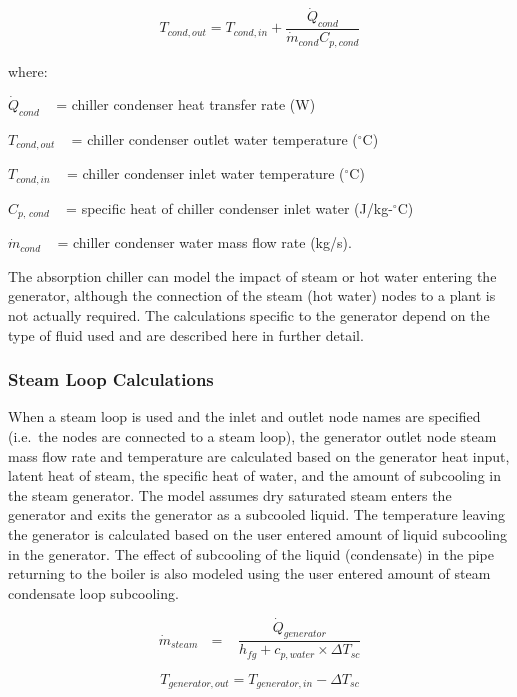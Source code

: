 \begin{equation}
  T_{cond,out} = T_{cond,in} + \frac{\dot{Q}_{cond}}{\dot{m}_{cond}C_{p,cond}}
\end{equation}

where:

\({\dot Q_{cond}}\) ~ = chiller condenser heat transfer rate (W)

\({T_{cond,out}}\) ~ = chiller condenser outlet water temperature (\(^{\circ}\)C)

\({T_{cond,in}}\) ~ = chiller condenser inlet water temperature (\(^{\circ}\)C)

\({C_{p,\,cond}}\) ~ = specific heat of chiller condenser inlet water (J/kg-\(^{\circ}\)C)

\({\dot m_{cond}}\) ~ = chiller condenser water mass flow rate (kg/s).

The absorption chiller can model the impact of steam or hot water entering the generator, although the connection of the steam (hot water) nodes to a plant is not actually required. The calculations specific to the generator depend on the type of fluid used and are described here in further detail.

\subsubsection{Steam Loop Calculations}\label{steam-loop-calculations-1}

When a steam loop is used and the inlet and outlet node names are specified (i.e.~the nodes are connected to a steam loop), the generator outlet node steam mass flow rate and temperature are calculated based on the generator heat input, latent heat of steam, the specific heat of water, and the amount of subcooling in the steam generator. The model assumes dry saturated steam enters the generator and exits the generator as a subcooled liquid. The temperature leaving the generator is calculated based on the user entered amount of liquid subcooling in the generator. The effect of subcooling of the liquid (condensate) in the pipe returning to the boiler is also modeled using the user entered amount of steam condensate loop subcooling.

\begin{equation}
{\dot m_{steam}}\,\,\,\, = \,\,\,\,\,\frac{{{{\dot Q}_{generator}}}}{{{h_{fg}} + {c_{p,water}} \times \Delta {T_{sc}}}}
\end{equation}

\begin{equation}
{T_{generator,out}} = {T_{generator,in}} - \Delta {T_{sc}}
\end{equation}

